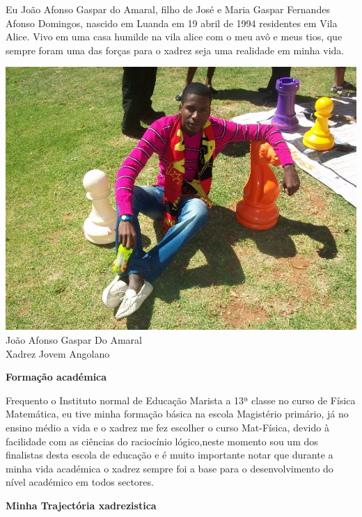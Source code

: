 \begin{multicols}{2}
\cappar Eu João Afonso Gaspar do Amaral, filho de José e Maria Gaspar Fernandes Afonso Domingos, nascido em Luanda em 19 abril de 1994 residentes em Vila Alice. Vivo em uma casa  humilde na vila alice com o meu avô e meus tios, que sempre foram uma das forças para o xadrez seja uma realidade  em minha vida. 

\begin{figurebox}
 \vspace{20pt}
 \centering
 \includegraphics[scale=0.22]{jugando2.jpg}\\
 João Afonso Gaspar Do Amaral\\ 
 {\small Xadrez Jovem Angolano}
 \vspace{1pt}
\end{figurebox}
\textbf{Formação académica}

Frequento o Instituto normal de Educação Marista a 13ª classe no curso de Física Matemática, eu tive minha formação básica na escola Magistério primário, já no ensino médio a vida e o xadrez me fez escolher o curso Mat-Física, devido à facilidade com as ciências do raciocínio lógico,neste momento sou um dos finalistas desta escola  de educação e é muito importante notar que durante a minha vida académica o xadrez sempre foi a base para o desenvolvimento do nível académico em todos sectores.

\textbf{Minha Trajectória xadrezistica}


\end{multicols}

